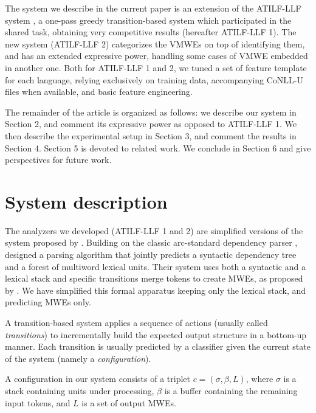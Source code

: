 \documentclass[output=paper,modfonts]{langscibook}
\begin{document}
The system we describe in the current paper is an extension of the ATILF-LLF system \citep{W17-1717}, a one-pass greedy transition-based system which participated in the shared task, obtaining very competitive results (hereafter ATILF-LLF 1). The new system (ATILF-LLF 2) categorizes the VMWEs on top of identifying them, and has an extended expressive power, handling some cases of VMWE embedded in another one. Both for ATILF-LLF 1 and 2, we tuned a set of feature template for each language, relying exclusively on training data, accompanying CoNLL-U files when available, and basic feature engineering.

The remainder of the article is organized as follows: we describe our system in Section 2, and comment its expressive power as opposed to ATILF-LLF 1. We then describe the experimental setup in Section 3, and comment the results in Section 4. Section 5 is devoted to related work. We conclude in Section 6 and give perspectives for future work. 

\section{System description}

The analyzers we developed (ATILF-LLF 1 and 2) are simplified versions of the system proposed by \citet{constant-nivre:acl:2016}. Building on the classic arc-standard dependency parser \citep{nivre04acl}, \citet{constant-nivre:acl:2016} designed a parsing algorithm that jointly predicts a syntactic dependency tree and a forest of multiword lexical units. Their system uses both a syntactic and a lexical stack and specific transitions merge tokens to create MWEs, as proposed by \citet{Nivre14}. We have simplified this formal apparatus keeping only the lexical stack, and predicting MWEs only.

A transition-based system applies a sequence of actions (usually called \emph{transitions}) to incrementally build the expected output structure in a bottom-up manner. Each transition is usually predicted by a classifier given the current state of the system (namely a \emph{configuration}).

A configuration in our system consists of a triplet $c = (\sigma, \beta, L)$, where $\sigma$ is a stack containing units under processing, $\beta$ is a buffer containing the remaining input tokens, and $L$ is a set of output MWEs.
\end{document}
